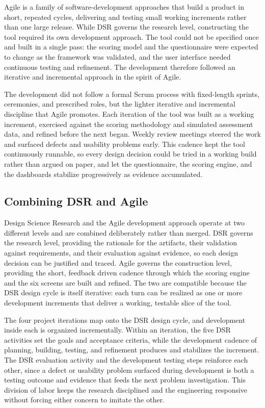 Agile is a family of software-development approaches that build a product in short, repeated cycles, delivering and testing small working increments rather than one large release. While DSR governs the research level, constructing the tool required its own development approach. The tool could not be specified once and built in a single pass: the scoring model and the questionnaire were expected to change as the framework was validated, and the user interface needed continuous testing and refinement. The development therefore followed an iterative and incremental approach in the spirit of Agile.

The development did not follow a formal Scrum process with fixed-length sprints, ceremonies, and prescribed roles, but the lighter iterative and incremental discipline that Agile promotes. Each iteration of the tool was built as a working increment, exercised against the scoring methodology and simulated assessment data, and refined before the next began. Weekly review meetings steered the work and surfaced defects and usability problems early. This cadence kept the tool continuously runnable, so every design decision could be tried in a working build rather than argued on paper, and let the questionnaire, the scoring engine, and the dashboards stabilize progressively as evidence accumulated.

\subsection{Combining DSR and Agile}

Design Science Research and the Agile development approach operate at two different levels and are combined deliberately rather than merged. DSR governs the research level, providing the rationale for the artifacts, their validation against requirements, and their evaluation against evidence, so each design decision can be justified and traced. Agile governs the construction level, providing the short, feedback driven cadence through which the scoring engine and the six screens are built and refined. The two are compatible because the DSR design cycle is itself iterative: each turn can be realized as one or more development increments that deliver a working, testable slice of the tool.

The four project iterations map onto the DSR design cycle, and development inside each is organized incrementally. Within an iteration, the five DSR activities set the goals and acceptance criteria, while the development cadence of planning, building, testing, and refinement produces and stabilizes the increment. The DSR evaluation activity and the development testing steps reinforce each other, since a defect or usability problem surfaced during development is both a testing outcome and evidence that feeds the next problem investigation. This division of labor keeps the research disciplined and the engineering responsive without forcing either concern to imitate the other.

